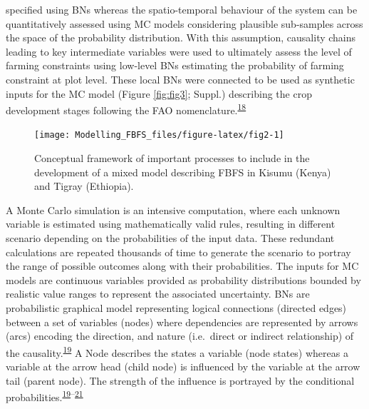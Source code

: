 \documentclass[12pt,oneside]{article}
\begin{document}
specified using BNs whereas the spatio-temporal behaviour of the system can be quantitatively assessed using MC models considering plausible sub-samples across the space of the probability distribution. With this assumption, causality chains leading to key intermediate variables were used to ultimately assess the level of farming constraints using low-level BNs estimating the probability of farming constraint at plot level. These local BNs were connected to be used as synthetic inputs for the MC model (Figure \ref{fig:fig3}; Suppl.) describing the crop development stages following the FAO nomenclature.\textsuperscript{\protect\hyperlink{ref-Allen_et_al_1998}{18}}

\begin{figure}[!htbp]

{\centering \texttt{[image: Modelling\_FBFS\_files/figure-latex/fig2-1]} 

}

\caption{Conceptual framework of important processes to include in the development of a mixed model describing FBFS in Kisumu (Kenya) and Tigray (Ethiopia).}\label{fig:fig2}
\end{figure}

A Monte Carlo simulation is an intensive computation, where each unknown variable is estimated using mathematically valid rules, resulting in different scenario depending on the probabilities of the input data. These redundant calculations are repeated thousands of time to generate the scenario to portray the range of possible outcomes along with their probabilities. The inputs for MC models are continuous variables provided as probability distributions bounded by realistic value ranges to represent the associated uncertainty. BNs are probabilistic graphical model representing logical connections (directed edges) between a set of variables (nodes) where dependencies are represented by arrows (arcs) encoding the direction, and nature (i.e.~direct or indirect relationship) of the causality.\textsuperscript{\protect\hyperlink{ref-Pearl_1988}{19}} A Node describes the states a variable (node states) whereas a variable at the arrow head (child node) is influenced by the variable at the arrow tail (parent node). The strength of the influence is portrayed by the conditional probabilities.\textsuperscript{\protect\hyperlink{ref-Pearl_1988}{19}--\protect\hyperlink{ref-Jensen_1996}{21}}
\end{document}
